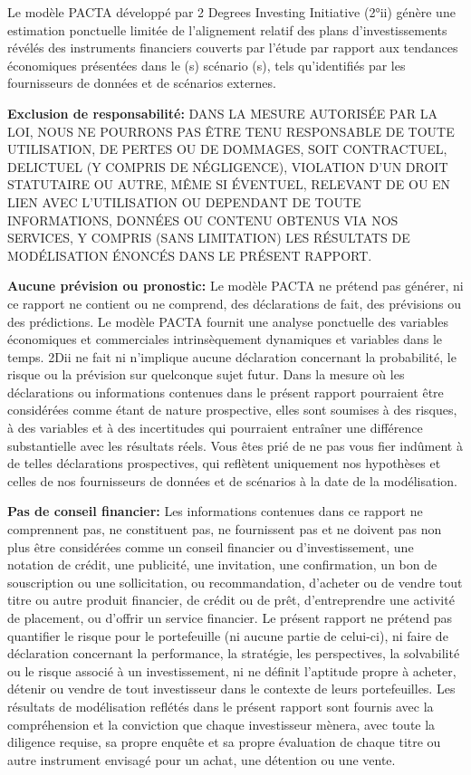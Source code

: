 \documentclass[10pt,table,a4]{article}\usepackage[]{graphicx}\usepackage[]{color}
\begin{document}
	
	Le modèle PACTA développé par 2 Degrees Investing Initiative (2°ii) génère une estimation ponctuelle limitée de l'alignement relatif des plans d’investissements révélés des instruments financiers couverts par l’étude par rapport aux tendances économiques présentées dans le (s) scénario (s), tels qu'identifiés par les fournisseurs de données et de scénarios externes. 
	
	\textbf{Exclusion de responsabilité: }DANS LA MESURE AUTORISÉE PAR LA LOI, NOUS NE POURRONS PAS ÊTRE TENU RES\-PON\-SABLE DE TOUTE UTILISATION, DE PERTES OU DE DOMMAGES, SOIT CONTRACTUEL, DELICTUEL (Y COMPRIS DE NÉ\-GLI\-GENCE), VIOLATION D'UN DROIT STATUTAIRE OU AUTRE, MÊME SI ÉVENTUEL, RELEVANT DE OU EN LIEN AVEC L’UTI\-LISA\-TION OU DEPENDANT DE TOUTE INFORMATIONS, DONNÉES OU CONTENU OBTENUS VIA NOS SERVICES, Y COMPRIS (SANS LIMITATION) LES RÉSULTATS DE MODÉLISATION ÉNONCÉS DANS LE PRÉSENT RAPPORT.
	
	
	\textbf{Aucune prévision ou pronostic: }Le modèle PACTA ne prétend pas générer, ni ce rapport ne contient ou ne comprend, des déclarations de fait, des prévisions ou des prédictions. Le modèle PACTA fournit une analyse ponctuelle des variables économiques et commerciales intrinsèquement dynamiques et variables dans le temps. 2Dii ne fait ni n'implique aucune déclaration concernant la probabilité, le risque ou la prévision sur quelconque sujet futur. Dans la mesure où les déclarations ou informations contenues dans le présent rapport pourraient être considérées comme étant de nature prospective, elles sont soumises à des risques, à des variables et à des incertitudes qui pourraient entraîner une différence substantielle avec les résultats réels. Vous êtes prié de ne pas vous fier indûment à de telles déclarations prospectives, qui reflètent uniquement nos hypothèses et celles de nos fournisseurs de données et de scénarios à la date de la modélisation.
	
	\textbf{Pas de conseil financier: }Les informations contenues dans ce rapport ne comprennent pas, ne constituent pas, ne fo\-ur\-ni\-ssent pas et ne doivent pas non plus être considérées comme un conseil financier ou d'investissement, une  notation de crédit, une publicité, une invitation, une confirmation, un bon de souscription ou une sollicitation, ou recommandation, d’acheter ou de vendre tout titre ou autre produit financier, de crédit ou de prêt, d’entreprendre une activité de placement, ou d’offrir un service financier. Le présent rapport ne prétend pas quantifier le risque pour le portefeuille (ni aucune partie de celui-ci), ni faire de déclaration concernant la performance, la stratégie, les perspectives, la solvabilité ou le risque associé à un investissement, ni ne définit l’aptitude propre à acheter, détenir ou vendre de tout investisseur dans le contexte de leurs portefeuilles. Les résultats de modélisation reflétés dans le présent rapport sont fournis avec la compréhension et la conviction que chaque investisseur mènera, avec toute la diligence requise, sa propre enquête et sa propre évaluation de chaque titre ou autre instrument envisagé pour un achat, une détention ou une vente.  
	
\end{document}
